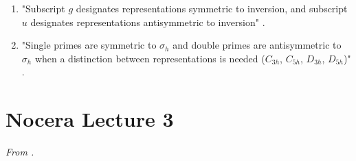 \documentclass[../notes.tex]{subfiles}
\begin{document}
\begin{itemize}
\begin{enumerate}
        \item "Subscript $g$ designates representations symmetric to inversion, and subscript $u$ designates representations antisymmetric to inversion" \parencite[100]{bib:MiesslerFischerTarr}.
        \item "Single primes are symmetric to $\sigma_h$ and double primes are antisymmetric to $\sigma_h$ when a distinction between representations is needed ($C_{3h}$, $C_{5h}$, $D_{3h}$, $D_{5h}$)" \parencite[100]{bib:MiesslerFischerTarr}.
    \end{enumerate}
\end{itemize}



\section{Nocera Lecture 3}
\emph{From \textcite{bib:NoceraLecture3}.}
\end{document}
